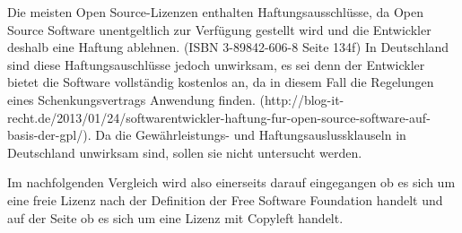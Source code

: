 Die meisten Open Source-Lizenzen enthalten Haftungsausschl\"usse, da Open Source Software unentgeltlich zur Verf\"ugung gestellt wird und die Entwickler deshalb eine Haftung ablehnen. (ISBN 3-89842-606-8 Seite 134f) In Deutschland sind diese Haftungsauschl\"usse jedoch unwirksam, es sei denn der Entwickler bietet die Software vollst\"andig kostenlos an, da in diesem Fall die Regelungen eines Schenkungsvertrags Anwendung finden. (http://blog-it-recht.de/2013/01/24/softwarentwickler-haftung-fur-open-source-software-auf-basis-der-gpl/). Da die Gew\"ahrleistungs- und Haftungsauslussklauseln in Deutschland unwirksam sind, sollen sie nicht untersucht werden.

Im nachfolgenden Vergleich wird also einerseits darauf eingegangen ob es sich um eine freie Lizenz nach der Definition der Free Software Foundation handelt und auf der Seite ob es sich um eine Lizenz mit Copyleft handelt. 